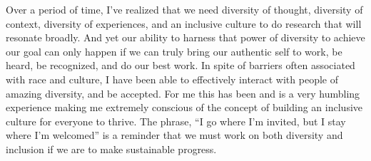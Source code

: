 \documentclass[a4papert]{article}
\begin{document}
\newpage

Over a period of time, I've realized that we need diversity of thought, diversity of context, diversity of experiences, and an inclusive culture to do research that will resonate broadly. And yet our ability to harness that power of diversity to achieve our goal can only happen if we can truly bring our authentic self to work, be heard, be recognized, and do our best work. In spite of barriers often associated with race and culture, I have been able to effectively interact with people of amazing diversity, and be accepted. For me this has been and is a very humbling experience making me extremely conscious of the concept of building an inclusive culture for everyone to thrive. The phrase, \enquote{I go where I’m invited, but I stay where I’m welcomed} is a reminder that we must work on both diversity and inclusion if we are to make sustainable progress. 
\end{document}
